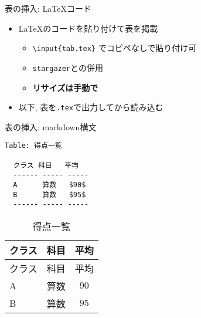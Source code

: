 \documentclass[
  12pt,
  ignorenonframetext,
]{beamer}
\newenvironment{Shaded}{\begin{snugshade}}{\end{snugshade}}
\newcommand{\DataTypeTok}[1]{\textcolor[rgb]{0.13,0.29,0.53}{#1}}
\newcommand{\KeywordTok}[1]{\textcolor[rgb]{0.13,0.29,0.53}{\textbf{#1}}}
\newcommand{\NormalTok}[1]{#1}
\newcommand{\OperatorTok}[1]{\textcolor[rgb]{0.81,0.36,0.00}{\textbf{#1}}}
\newcommand{\StringTok}[1]{\textcolor[rgb]{0.31,0.60,0.02}{#1}}
\providecommand{\tightlist}{%
  \setlength{\itemsep}{0pt}\setlength{\parskip}{0pt}}
\begin{document}
\begin{frame}[fragile]{表の挿入: \LaTeX コード}
\protect\hypertarget{ux8868ux306eux633fux5165-ux30b3ux30fcux30c9}{}

\begin{itemize}
\tightlist
\item
  \LaTeX のコードを貼り付けて表を掲載

  \begin{itemize}
  \tightlist
  \item
    \texttt{\textbackslash{}input\{tab.tex\}} でコピペなしで貼り付け可
  \item
    \texttt{stargazer}との併用
  \item
    \textbf{リサイズは手動で}
  \end{itemize}
\item
  以下, 表を\texttt{.tex}で出力してから読み込む
\end{itemize}

\begin{Shaded}
\end{Shaded}



\end{frame}

\begin{frame}[fragile]{表の挿入: markdown構文}
\protect\hypertarget{ux8868ux306eux633fux5165-markdownux69cbux6587}{}

\small

\begin{verbatim}
Table: 得点一覧

  クラス 科目   平均
  ------ ----- -----
  A      算数   $90$
  B      算数   $95$
  ------ ----- -----
\end{verbatim}

\normalsize

\begin{longtable}[]{@{}llc@{}}
\caption{得点一覧}\tabularnewline
\toprule
クラス & 科目 & 平均\tabularnewline
\midrule
\endfirsthead
\toprule
クラス & 科目 & 平均\tabularnewline
\midrule
\endhead
A & 算数 & \(90\)\tabularnewline
B & 算数 & \(95\)\tabularnewline
\bottomrule
\end{longtable}

\end{frame}
\end{document}
